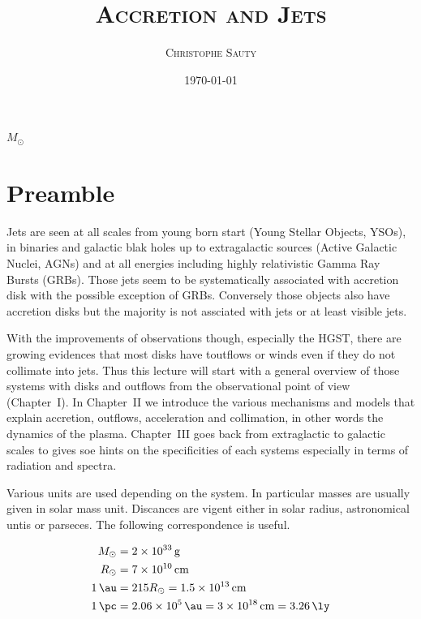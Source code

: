 \documentclass[10pt,a4paper,english,draft]{article}
\title{\textsc{Accretion and Jets}}
\author{\textsc{Christophe Sauty}}
\date{\today}
\begin{document}

\maketitle

\begin{center}
    $M_{\odot}$ %
\end{center}

\section*{Preamble}

Jets are seen at all scales from young born start (Young Stellar Objects,
YSOs), in binaries and galactic blak holes up to extragalactic sources (Active
Galactic Nuclei, AGNs) and at all energies including highly relativistic Gamma
Ray Bursts (GRBs). Those jets seem to be systematically associated with
accretion disk with the possible exception of GRBs. Conversely those objects
also have accretion disks but the majority is not assciated with jets or at
least visible jets.

With the improvements of observations though, especially the HGST, there are
growing evidences that most disks have toutflows or winds even if they do not
collimate into jets. Thus this lecture will start with a general overview of
those systems with disks and outflows from the observational point of view
(Chapter~I). In Chapter~II we introduce the various mechanisms and models that
explain accretion, outflows, acceleration and collimation, in other words the
dynamics of the plasma. Chapter~III goes back from extraglactic to galactic
scales to gives soe hints on the specificities of each systems especially in
terms of radiation and spectra.

Various units are used depending on the system. In particular masses are
usually given in solar mass unit. Discances are vigent either in solar radius,
astronomical untis or parseces. The following correspondence is useful.

\begin{align*}
    M_\odot &= \SI{2e33}{\gram} \\
    R_\odot &= \SI{7e10}{\cm} \\
    \SI{1}{\au} &= 215 R_\odot = \SI{1.5e13}{\cm} \\
    \SI{1}{\pc} &= \SI{2.06e5}{\au} = \SI{3e18}{\cm} = \SI{3.26}{\ly}
\end{align*}
\end{document}
